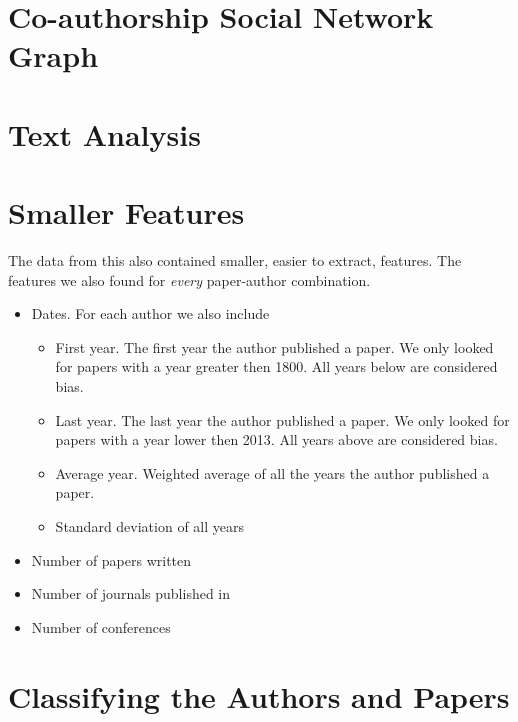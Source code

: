 
\section{Co-authorship Social Network Graph \label{sec:graph-implementation}}



\section{Text Analysis \label{sec:text-implementation}}



\section{Smaller Features \label{sec:smaller-features-implementation}}

The data from this also contained smaller, easier to extract, features. The features we also found for \textit{every} paper-author combination.

\begin{itemize}
\item[]Dates. For each author we also include
\begin{itemize}
\item[] First year. The first year the author published a paper. We only looked for papers with a year greater then 1800. All years below are considered bias.
\item[] Last year. The last year the author published a paper. We only looked for papers with a year lower then 2013. All years above are considered bias.
\item[] Average year. Weighted average of all the years the author published a paper.
\item[] Standard deviation of all years
\end{itemize}
\item[] Number of papers written
\item[] Number of journals published in 
\item[] Number of conferences
\end{itemize}


\section{Classifying the Authors and Papers \label{sec:classifier-implementation}}

